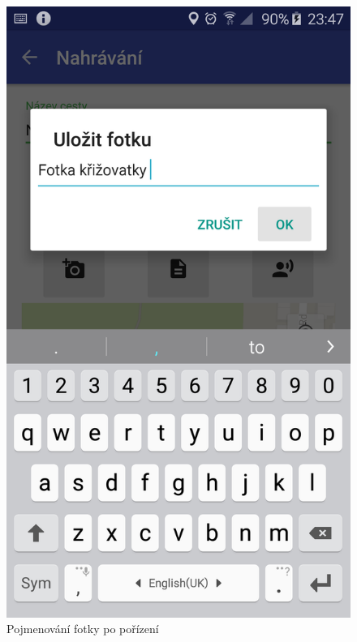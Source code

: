 \documentclass[czech,master,public,dept460,male,java,cpdeclaration]{diploma}
\begin{document}
\begin{figure}[H]
\begin{minipage}{.5\textwidth}
\centering
                \includegraphics[scale=0.14]{img/screen/ulozenifotky.png}
        \caption{Pojmenování fotky po pořízení}
        \label{fig:pridanifotky}
\end{minipage}
\begin{minipage}{.5\textwidth}
     \centering

\end{minipage}
\end{figure}
\end{document}
